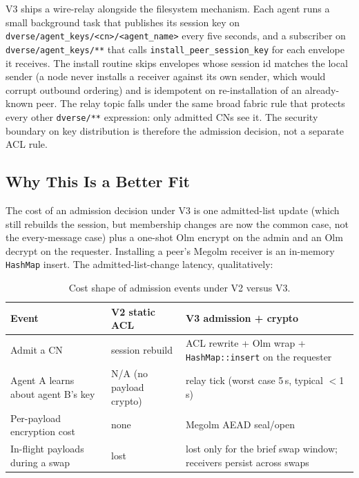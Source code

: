 \documentclass[11pt,a4paper]{article}
\begin{document}
V3 ships a wire-relay alongside the filesystem mechanism. Each agent
runs a small background task that publishes its session key on
\texttt{dverse/agent\_keys/<cn>/<agent\_name>} every five seconds,
and a subscriber on \texttt{dverse/agent\_keys/**} that calls
\texttt{install\_peer\_session\_key} for each envelope it receives.
The install routine skips envelopes whose session id matches the
local sender (a node never installs a receiver against its own
sender, which would corrupt outbound ordering) and is idempotent on
re-installation of an already-known peer. The relay topic falls
under the same broad fabric rule that protects every other
\texttt{dverse/**} expression: only admitted CNs see it. The security
boundary on key distribution is therefore the admission decision, not
a separate ACL rule.

\subsection{Why This Is a Better Fit}

The cost of an admission decision under V3 is one admitted-list
update (which still rebuilds the session, but membership changes are
now the common case, not the every-message case) plus a one-shot Olm
encrypt on the admin and an Olm decrypt on the requester. Installing
a peer's Megolm receiver is an in-memory \texttt{HashMap} insert. The
admitted-list-change latency, qualitatively:

\begin{table}[H]
  \centering
  \small
  \begin{tabular}{|p{4.4cm}|p{3.4cm}|p{6.4cm}|}
    \hline
    \rowcolor{gray!15}
    \textbf{Event} & \textbf{V2 static ACL} & \textbf{V3 admission + crypto} \\
    \hline
    Admit a CN & session rebuild & ACL rewrite + Olm wrap + \texttt{HashMap::insert} on the requester \\
    \hline
    Agent A learns about agent B's key & N/A (no payload crypto) & relay tick (worst case 5\,s, typical $<$1\,s) \\
    \hline
    Per-payload encryption cost & none & Megolm AEAD seal/open \\
    \hline
    In-flight payloads during a swap & lost & lost only for the brief swap window; receivers persist across swaps \\
    \hline
  \end{tabular}
  \caption{Cost shape of admission events under V2 versus V3.}
  \label{tab:v2v3}
\end{table}
\end{document}
